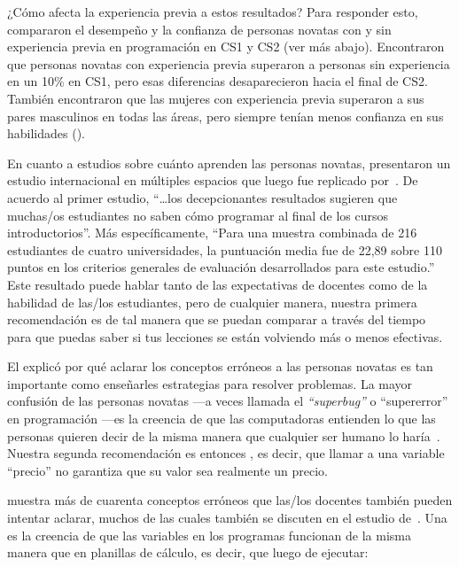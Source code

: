 ¿Cómo afecta la experiencia previa a estos resultados?
Para responder esto,
\cite{Wilc2018} compararon el desempeño y la confianza de personas novatas
con y sin experiencia previa en programación en CS1 y CS2 (ver más abajo).
Encontraron que personas novatas con experiencia previa superaron a personas sin experiencia en un 10\% en CS1,
pero esas diferencias desaparecieron hacia el final de CS2.
También encontraron que las mujeres con experiencia previa superaron a sus pares masculinos en todas las áreas,
pero siempre tenían menos confianza en sus habilidades ().

En cuanto a estudios sobre cuánto aprenden las personas novatas,
\cite{McCr2001} presentaron un estudio internacional en múltiples espacios que luego fue replicado por~\cite{Utti2013}.
De acuerdo al primer estudio,
``{\ldots}los decepcionantes resultados sugieren que
muchas/os estudiantes no saben cómo programar al final de los cursos introductorios''.
Más específicamente,
``Para una muestra combinada de 216 estudiantes de cuatro universidades,
la puntuación media fue de 22,89 sobre 110 puntos en los criterios generales de evaluación desarrollados para este estudio.''
Este resultado puede hablar tanto de las expectativas de docentes como de la habilidad de las/los estudiantes,
pero de cualquier manera,
nuestra primera recomendación es 
de tal manera que se puedan comparar a través del tiempo para que puedas saber si tus lecciones se están volviendo más o menos efectivas.


El  explicó por qué aclarar los conceptos erróneos a las personas novatas es tan importante como enseñarles
estrategias para resolver problemas.
La mayor confusión de las personas novatas ---a veces llamada el \emph{``superbug''} o ``supererror'' en programación ---es 
la creencia de que las computadoras entienden lo que las personas quieren decir de la misma manera que cualquier ser humano lo haría~\cite{Pea1986}.
Nuestra segunda recomendación es entonces ,
es decir, que llamar a una variable ``precio'' no garantiza que su valor sea realmente un precio.

\cite{Sorv2018} muestra más de cuarenta conceptos erróneos que las/los docentes también pueden intentar aclarar,
muchos de las cuales también se discuten en el estudio de~\cite{Qian2017}.
Una es la creencia de que las variables en los programas funcionan de la misma manera que en planillas de cálculo,
es decir, que luego de ejecutar:

